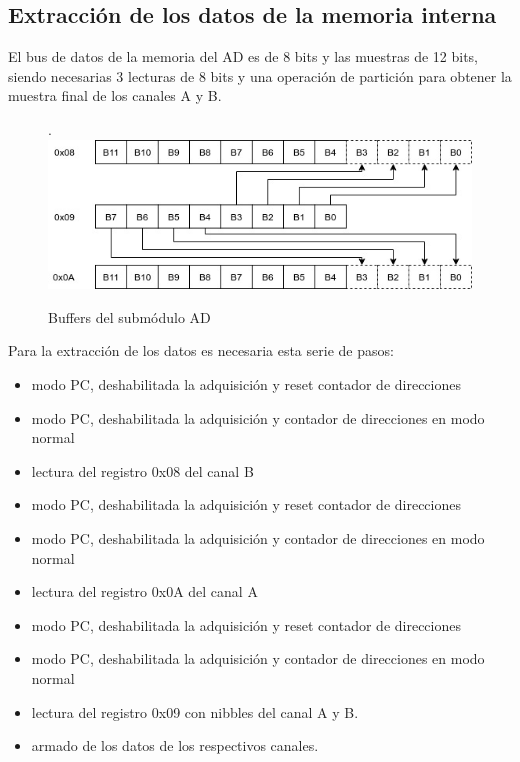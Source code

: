 \subsection{Extracci\'on de los datos de la memoria interna}

El bus de datos de la memoria del AD es de 8 bits y las muestras de 12 bits,
siendo necesarias 3 lecturas de 8 bits y una operaci\'on de partici\'on para
obtener la muestra final de los canales A y B.

\begin{figure}[!htb].
    \includegraphics[width=\linewidth]{../figures/d8.jpg}
    \caption{Buffers del subm\'odulo AD}
    \label{fig:d8}
\end{figure}

Para la extracci\'on de los datos es necesaria esta serie de pasos:

\begin{itemize}
    \item modo PC, deshabilitada la adquisici\'on y reset contador de direcciones
    \item modo PC, deshabilitada la adquisici\'on y contador de direcciones en modo normal
    \item lectura del registro 0x08 del canal B
    \item modo PC, deshabilitada la adquisici\'on y reset contador de direcciones
    \item modo PC, deshabilitada la adquisici\'on y contador de direcciones en modo normal
    \item lectura del registro 0x0A del canal A
    \item modo PC, deshabilitada la adquisici\'on y reset contador de direcciones
    \item modo PC, deshabilitada la adquisici\'on y contador de direcciones en modo normal
    \item lectura del registro 0x09 con nibbles del canal A y B.
    \item armado de los datos de los respectivos canales.
\end{itemize}

